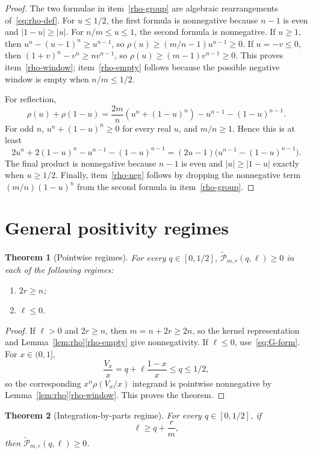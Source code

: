 \documentclass[11pt]{article}
\newtheorem{theorem}{Theorem}[section]
\newcommand{\wtP}{\widetilde{\mathcal P}}
\begin{document}
\begin{proof}
The two formulae in item~\ref{rho-group} are algebraic rearrangements of~\eqref{eq:rho-def}.  For $u\le1/2$, the first formula is nonnegative because $n-1$ is even and $|1-u|\ge |u|$.  For $n/m\le u\le1$, the second formula is nonnegative.  If $u\ge1$, then $u^n-(u-1)^n\ge u^{n-1}$, so $\rho(u)\ge(m/n-1)u^{n-1}\ge0$.  If $u=-v\le0$, then $(1+v)^n-v^n\ge nv^{n-1}$, so $\rho(u)\ge(m-1)v^{n-1}\ge0$.  This proves item~\ref{rho-window}; item~\ref{rho-empty} follows because the possible negative window is empty when $n/m\le1/2$.

For reflection,
\[
        \rho(u)+\rho(1-u)=\frac{2m}{n}(u^n+(1-u)^n)-u^{n-1}-(1-u)^{n-1}.
\]
For odd $n$, $u^n+(1-u)^n\ge0$ for every real $u$, and $m/n\ge1$.  Hence this is at least
\[
        2u^n+2(1-u)^n-u^{n-1}-(1-u)^{n-1}
        =(2u-1)\bigl(u^{n-1}-(1-u)^{n-1}\bigr).
\]
The final product is nonnegative because $n-1$ is even and $|u|\ge|1-u|$ exactly when $u\ge1/2$.  Finally, item~\ref{rho-neg} follows by dropping the nonnegative term $(m/n)(1-u)^n$ from the second formula in item~\ref{rho-group}.
\end{proof}

\section{General positivity regimes}\label{sec:general-pos}

\begin{theorem}[Pointwise regimes]\label{thm:pointwise}
For every $q\in[0,1/2]$, $\wtP_{m,r}(q,\ell)\ge0$ in each of the following regimes:
\begin{enumerate}[label=\textup{(\alph*)}]
\item $2r\ge n$;
\item $\ell\le0$.
\end{enumerate}
\end{theorem}

\begin{proof}
If $\ell>0$ and $2r\ge n$, then $m=n+2r\ge2n$, so the kernel representation and Lemma~\ref{lem:rho}\ref{rho-empty} give nonnegativity.  If $\ell\le0$, use~\eqref{eq:G-form}.  For $x\in(0,1]$,
\[
        \frac{V_x}{x}=q+\ell\frac{1-x}{x}\le q\le1/2,
\]
so the corresponding $x^n\rho(V_x/x)$ integrand is pointwise nonnegative by Lemma~\ref{lem:rho}\ref{rho-window}.  This proves the theorem.
\end{proof}

\begin{theorem}[Integration-by-parts regime]\label{thm:ibp}
For every $q\in[0,1/2]$, if
\[
        \ell\ge q+\frac rm,
\]
then $\wtP_{m,r}(q,\ell)\ge0$.
\end{theorem}
\end{document}
